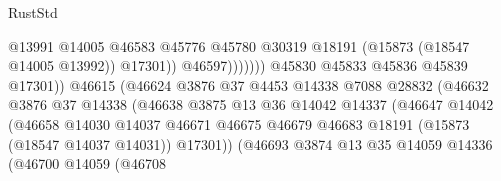 \begin{lexlean}{RustStd}
\begin{coremodule}
                                                      @13991
                                                      @14005
                                                      @46583
                                                      @45776
                                                      @45780
                                                      @30319
                                                      @18191
                                                      (@15873 (@18547 @14005 @13992))
                                                      @17301))
                                                  @46597)))))))
                                    @45830
                                    @45833
                                    @45836
                                    @45839
                                    @17301))
                                @46615
                                (@46624
                                  @3876
                                  @37
                                  @4453
                                  @14338
                                  @7088
                                  @28832
                                  (@46632
                                    @3876
                                    @37
                                    @14338
                                    (@46638
                                      @3875
                                      @13
                                      @36
                                      @14042
                                      @14337
                                      (@46647
                                        @14042
                                        (@46658
                                          @14030
                                          @14037
                                          @46671
                                          @46675
                                          @46679
                                          @46683
                                          @18191
                                          (@15873 (@18547 @14037 @14031))
                                          @17301))
                                      (@46693
                                        @3874
                                        @13
                                        @35
                                        @14059
                                        @14336
                                        (@46700
                                          @14059
                                          (@46708

\end{coremodule}
\end{lexlean}
